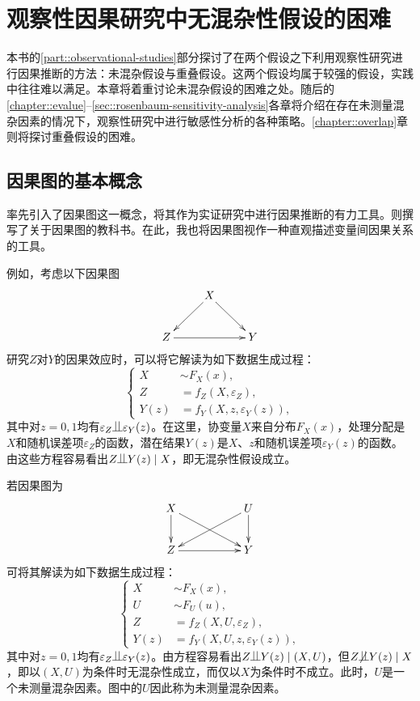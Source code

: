 
\chapter{观察性因果研究中无混杂性假设的困难}
 \label{chapter::difficulties-observational-studies}
 
 
本书的\ref{part::observational-studies}部分探讨了在两个假设之下利用观察性研究进行因果推断的方法：未混杂假设与重叠假设。这两个假设均属于较强的假设，实践中往往难以满足。本章将着重讨论未混杂假设的困难之处。随后的\ref{chapter::evalue}--\ref{sec::rosenbaum-sensitivity-analysis}各章将介绍在存在未测量混杂因素的情况下，观察性研究中进行敏感性分析的各种策略。\ref{chapter::overlap}章则将探讨重叠假设的困难。 
 
 
 

\section{因果图的基本概念}


\citet{pearl1995causal}率先引入了因果图这一概念，将其作为实证研究中进行因果推断的有力工具。\citet{pearl2000causality}则撰写了关于因果图的教科书。在此，我也将因果图视作一种直观描述变量间因果关系的工具。 

例如，考虑以下因果图$$
\xymatrix{
 & X \ar[ld]\ar[rd] \\
Z\ar[rr] &&Y 
}
$$研究$Z$对$Y$的因果效应时，可以将它解读为如下数据生成过程：$$
\left\{ 
\begin{aligned}
      X & \sim F_X(x), \\
      Z  &=   f_Z(X, \varepsilon_Z) , \\
      Y(z) &=  f_Y(X, z, \varepsilon_Y(z)) ,
\end{aligned}
\right. 
$$其中对$z=0,1$均有$\varepsilon_Z \ind \varepsilon_Y(z)$。在这里，协变量$X$来自分布$F_X(x)$，处理分配是$X$和随机误差项$\varepsilon_Z$的函数，潜在结果$ Y(z) $是$X$、$z$和随机误差项$\varepsilon_Y(z)$的函数。由这些方程容易看出$Z\ind Y(z) \mid X$，即无混杂性假设成立。 


若因果图为$$
\xymatrix{
 X \ar[d]\ar[rrd] & & U\ar[d]\ar[lld] \\
Z\ar[rr] &&Y 
}
$$可将其解读为如下数据生成过程：$$
\left\{ 
\begin{aligned}
       X & \sim F_X(x), \\
       U& \sim F_U(u), \\ 
      Z  &=   f_Z(X, U,  \varepsilon_Z) , \\
      Y(z) &=  f_Y(X, U, z, \varepsilon_Y(z)) ,
\end{aligned}
\right. 
$$其中对$z=0,1$均有$\varepsilon_Z \ind \varepsilon_Y(z)$。由方程容易看出$Z\ind Y(z) \mid (X,U)$，但$Z\nind Y(z) \mid X$，即以$(X,U)$为条件时无混杂性成立，而仅以$X$为条件时不成立。此时，$U$是一个未测量混杂因素。图中的$U$因此称为未测量混杂因素。 







